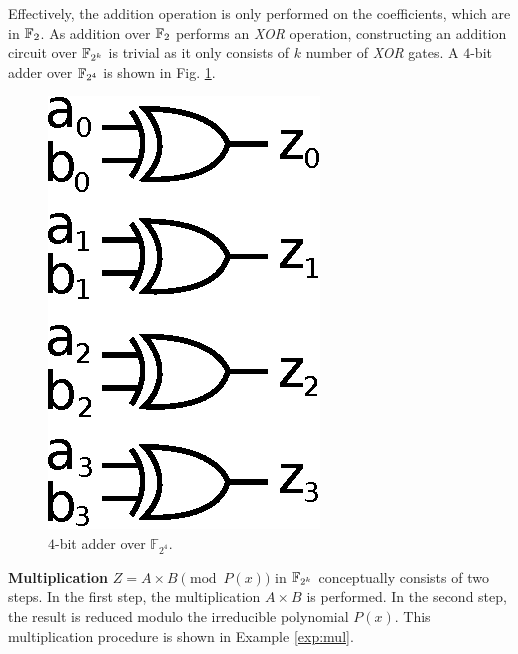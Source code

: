 Effectively, the addition operation is only performed on the coefficients, 
which are in ${\mathbb{F}}_2$. 
As addition over ${\mathbb{F}}_2$ performs an {\it XOR} operation,
constructing an addition circuit over ${\mathbb{F}}_{2^k}$ is trivial as it
only consists of $k$ number of {\it XOR} gates. 
A $4$-bit adder over ${\mathbb{F}}_{2^4}$ is shown in
Fig. \ref{fig:adder4}.
\begin{figure}[H]
\begin{center}
\includegraphics[scale=0.6]{figures/adder4bit}
\end{center}
\caption{$4$-bit adder over $\mathbb{F}_{2^4}$.}
\label{fig:adder4}
\end{figure}

{\bf Multiplication} $Z =A\times B \pmod{ P(x) }$ in ${\mathbb{F}}_{2^k}$ conceptually consists of 
two steps.
In the first step, the multiplication $A\times B$ is performed. In the second 
step, the result is reduced
modulo the irreducible polynomial $P(x)$.
This multiplication procedure is shown in Example \ref{exp:mul}.

